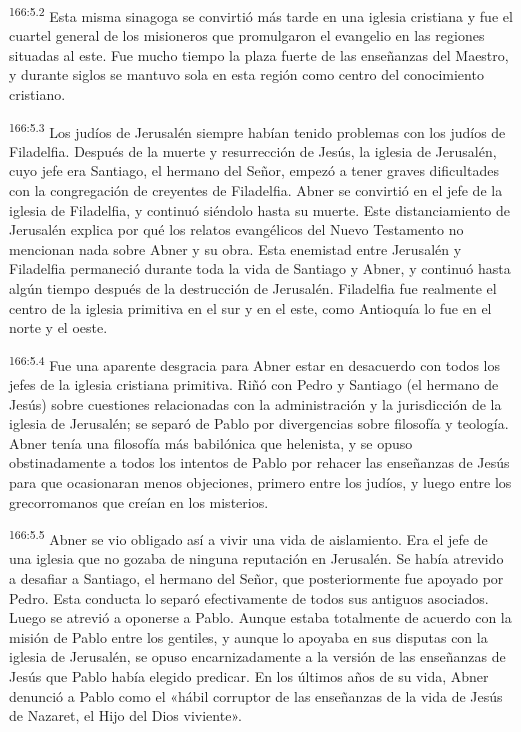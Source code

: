 \par
\textsuperscript{166:5.2} Esta misma sinagoga se convirtió más tarde en una iglesia cristiana y fue el cuartel general de los misioneros que promulgaron el evangelio en las regiones situadas al este. Fue mucho tiempo la plaza fuerte de las enseñanzas del Maestro, y durante siglos se mantuvo sola en esta región como centro del conocimiento cristiano.

\par
\textsuperscript{166:5.3} Los judíos de Jerusalén siempre habían tenido problemas con los judíos de Filadelfia. Después de la muerte y resurrección de Jesús, la iglesia de Jerusalén, cuyo jefe era Santiago, el hermano del Señor, empezó a tener graves dificultades con la congregación de creyentes de Filadelfia. Abner se convirtió en el jefe de la iglesia de Filadelfia, y continuó siéndolo hasta su muerte. Este distanciamiento de Jerusalén explica por qué los relatos evangélicos del Nuevo Testamento no mencionan nada sobre Abner y su obra. Esta enemistad entre Jerusalén y Filadelfia permaneció durante toda la vida de Santiago y Abner, y continuó hasta algún tiempo después de la destrucción de Jerusalén. Filadelfia fue realmente el centro de la iglesia primitiva en el sur y en el este, como Antioquía lo fue en el norte y el oeste.

\par
\textsuperscript{166:5.4} Fue una aparente desgracia para Abner estar en desacuerdo con todos los jefes de la iglesia cristiana primitiva. Riñó con Pedro y Santiago (el hermano de Jesús) sobre cuestiones relacionadas con la administración y la jurisdicción de la iglesia de Jerusalén; se separó de Pablo por divergencias sobre filosofía y teología. Abner tenía una filosofía más babilónica que helenista, y se opuso obstinadamente a todos los intentos de Pablo por rehacer las enseñanzas de Jesús para que ocasionaran menos objeciones, primero entre los judíos, y luego entre los grecorromanos que creían en los misterios.

\par
\textsuperscript{166:5.5} Abner se vio obligado así a vivir una vida de aislamiento. Era el jefe de una iglesia que no gozaba de ninguna reputación en Jerusalén. Se había atrevido a desafiar a Santiago, el hermano del Señor, que posteriormente fue apoyado por Pedro. Esta conducta lo separó efectivamente de todos sus antiguos asociados. Luego se atrevió a oponerse a Pablo. Aunque estaba totalmente de acuerdo con la misión de Pablo entre los gentiles, y aunque lo apoyaba en sus disputas con la iglesia de Jerusalén, se opuso encarnizadamente a la versión de las enseñanzas de Jesús que Pablo había elegido predicar. En los últimos años de su vida, Abner denunció a Pablo como el «hábil corruptor de las enseñanzas de la vida de Jesús de Nazaret, el Hijo del Dios viviente».

